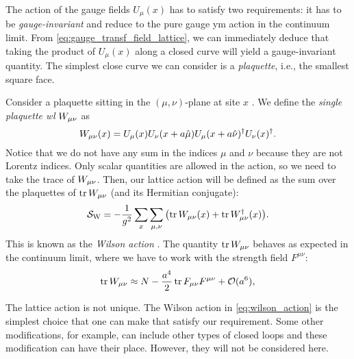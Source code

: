 The action of the gauge fields $U_{\mu}(x)$ has to satisfy two requirements:
it has to be \emph{gauge-invariant} and reduce to the pure gauge \ac{ym} action in the continuum limit.
From \eqref{eq:gauge_transf_field_lattice}, we can immediately deduce that taking the product of $U_{\mu}(x)$ along a closed curve will yield a gauge-invariant quantity.
The simplest close curve we can consider is a \emph{plaquette}, i.e., the smallest square face.

Consider a plaquette sitting in the $(\mu, \nu)$-plane at site $x$ .
We define the \emph{single plaquette \acl{wl}} $W_{\mu \nu}$ as
\begin{equation}
    W_{\mu \nu}(x) =
    U_{\mu}(x) U_{\nu}(x + a \hat{\mu}) U_{\mu}(x + a \hat{\nu})^{\dagger} U_{\nu}(x)^{\dagger}.
    \label{eq:single_plaquette_Wilson_loop}
\end{equation}
Notice that we do not have any sum in the indices $\mu$ and $\nu$ because they are not Lorentz indices.
Only scalar quantities are allowed in the action, so we need to take the trace of $W_{\mu \nu}$.
Then, our lattice action will be defined as the sum over the plaquettes of $\tr W_{\mu \nu}$ (and its Hermitian conjugate):
\begin{equation}
    \mathcal{S}_{\text{W}} = - \frac{1}{g^2} \sum_{x} \sum_{\mu, \nu}  \qty( \tr W_{\mu \nu}(x) + \tr W_{\mu \nu}^{\dagger}(x) ).
    \label{eq:wilson_action}
\end{equation}
This is known as the \emph{Wilson action} \cite{wilson1974confinement, creutz1985book}.
The quantity $\tr W_{\mu \nu}$ behaves as expected in the continuum limit, where we have to work with the strength field $F^{\mu \nu}$:
\begin{equation}
    \tr W_{\mu \nu} \approx N - \frac{a^{4}}{2} \tr F_{\mu \nu} F^{\mu \nu} + \mathcal{O}(a^6),
\end{equation}

The lattice action is not unique.
The Wilson action in \eqref{eq:wilson_action} is the simplest choice that one can make that satisfy our requirement.
Some other modifications, for example, can include other types of closed loops and these modification can have their place\citneeded.
However, they will not be considered here.

